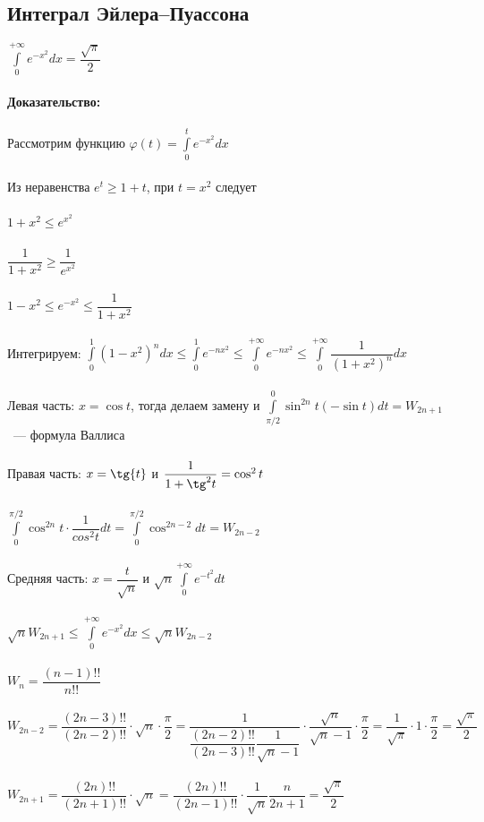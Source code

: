 \documentclass[../main.tex]{subfiles}
\begin{document}
\subsection{Интеграл Эйлера--Пуассона}
$\int\limits^{+\infty}_0 e^{-x^2} dx = \dfrac{\sqrt{\pi}}{2}$\\\\ \textbf{Доказательство:}\\\\
Рассмотрим функцию $\varphi(t) = \int\limits^t_0 e^{-x^2} dx$\\\\
Из неравенства $e^t \geq 1 + t$, при $t = x^2$ следует\\\\
$1 + x^2 \leq e^{x^2}$\\\\
$\dfrac{1}{1 + x^2} \geq \dfrac{1}{e^{x^2}}$\\\\
$1 - x^2 \leq e^{-x^2} \leq \dfrac{1}{1 + x^2}$\\\\
Интегрируем: $\int\limits^1_0 (1 - x^2)^n dx \leq \int\limits^1_0 e^{-nx^2} \leq \int\limits^{+\infty}_0 e^{-nx^2} \leq \int\limits^{+\infty}_{0} \dfrac{1}{(1 + x^2)^n} dx$\\\\
Левая часть: $x = \cos{t}$, тогда делаем замену и $\int\limits^0_{\pi / 2} \sin^{2n} {t} (-\sin{t}) dt = W_{2n + 1}$ ~--- формула Валлиса\\\\
Правая часть: $x = \tg {t}$ и $\dfrac{1}{1 + \tg^2{t}} = \cos^2{t}$\\\\
$\int\limits^{\pi / 2}_0 \cos^{2n} t \cdot \dfrac{1}{cos^2 t} dt = \int\limits^{\pi / 2}_0 \cos^{2n - 2} dt = W_{2n - 2}$\\\\
Средняя часть: $x = \dfrac{t}{\sqrt{n}}$ и $\sqrt{n} \int\limits^{+\infty}_0 e^{-t^2} dt$\\\\
$\sqrt{n} W_{2n + 1} \leq \int\limits^{+\infty}_0 e^{-x^2} dx \leq \sqrt{n} W_{2n - 2}$\\\\
$W_n = \dfrac{(n - 1)!!}{n!!}$\\\\
$W_{2n - 2} = \dfrac{(2n - 3)!!}{(2n - 2)!!} \cdot \sqrt{n} \cdot \dfrac{\pi}{2} = \dfrac{1}{\dfrac{(2n - 2)!!}{(2n - 3)!!} \dfrac{1}{\sqrt{n} - 1}} \cdot \dfrac{\sqrt{n}}{\sqrt{n} - 1} \cdot \dfrac{\pi}{2} = \dfrac{1}{\sqrt{\pi}} \cdot 1 \cdot \dfrac{\pi}{2} = \dfrac{\sqrt{\pi}}{2}$\\\\
$W_{2n + 1} = \dfrac{(2n)!!}{(2n + 1)!!} \cdot \sqrt{n} = \dfrac{(2n)!!}{(2n - 1)!!} \cdot \dfrac{1}{\sqrt{n}} \dfrac{n}{2n + 1} = \dfrac{\sqrt{\pi}}{2}$
\newpage
\end{document}
